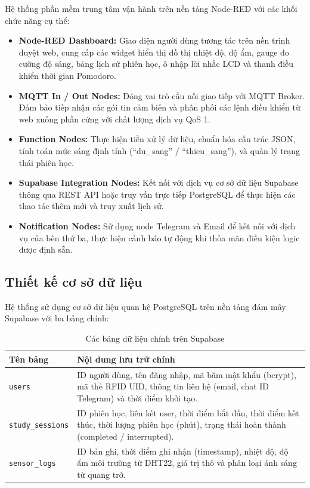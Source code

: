 Hệ thống phần mềm trung tâm vận hành trên nền tảng Node-RED với các khối chức năng cụ thể:
\begin{itemize}
    \item \textbf{Node-RED Dashboard:} Giao diện người dùng tương tác trên nền trình duyệt web, cung cấp các widget hiển thị đồ thị nhiệt độ, độ ẩm, gauge đo cường độ sáng, bảng lịch sử phiên học, ô nhập lời nhắc LCD và thanh điều khiển thời gian Pomodoro.
    \item \textbf{MQTT In / Out Nodes:} Đóng vai trò cầu nối giao tiếp với MQTT Broker. Đảm bảo tiếp nhận các gói tin cảm biến và phân phối các lệnh điều khiển từ web xuống phần cứng với chất lượng dịch vụ QoS 1.
    \item \textbf{Function Nodes:} Thực hiện tiền xử lý dữ liệu, chuẩn hóa cấu trúc JSON, tính toán mức sáng định tính (``du\_sang'' / ``thieu\_sang''), và quản lý trạng thái phiên học.
    \item \textbf{Supabase Integration Nodes:} Kết nối với dịch vụ cơ sở dữ liệu Supabase thông qua REST API hoặc truy vấn trực tiếp PostgreSQL để thực hiện các thao tác thêm mới và truy xuất lịch sử.
    \item \textbf{Notification Nodes:} Sử dụng node Telegram và Email để kết nối với dịch vụ của bên thứ ba, thực hiện cảnh báo tự động khi thỏa mãn điều kiện logic được định sẵn.
\end{itemize}

\subsection{Thiết kế cơ sở dữ liệu}

Hệ thống sử dụng cơ sở dữ liệu quan hệ PostgreSQL trên nền tảng đám mây Supabase với ba bảng chính:

\begin{table}[htbp]
\centering
\begin{tabular}{|l|p{11cm}|}
\hline
\textbf{Tên bảng} & \textbf{Nội dung lưu trữ chính} \\ \hline
\texttt{users} & ID người dùng, tên đăng nhập, mã băm mật khẩu (bcrypt), mã thẻ RFID UID, thông tin liên hệ (email, chat ID Telegram) và thời điểm khởi tạo. \\ \hline
\texttt{study\_sessions} & ID phiên học, liên kết user, thời điểm bắt đầu, thời điểm kết thúc, thời lượng phiên học (phút), trạng thái hoàn thành (completed / interrupted). \\ \hline
\texttt{sensor\_logs} & ID bản ghi, thời điểm ghi nhận (timestamp), nhiệt độ, độ ẩm môi trường từ DHT22, giá trị thô và phân loại ánh sáng từ quang trở. \\ \hline
\end{tabular}
\caption{Các bảng dữ liệu chính trên Supabase}
\label{tab:database_tables}
\end{table}


